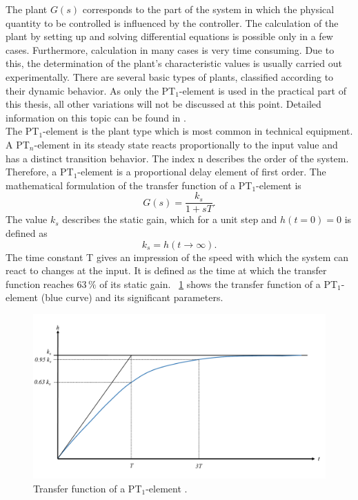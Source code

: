 The plant $G(s)$ corresponds to the part of the system in which the physical quantity to be controlled is influenced by the controller. The calculation of the plant by setting up and solving differential equations is possible only in a few cases. Furthermore, calculation in many cases is very time consuming. Due to this, the determination of the plant's characteristic values is usually carried out experimentally. There are several basic types of plants, classified according to their dynamic behavior. As only the PT$_{1}$-element is used in the practical part of this thesis, all other variations will not be discussed at this point. Detailed information on this topic can be found in \cite{Reg_10}.
\\The PT$_{1}$-element is the plant type which is most common in technical equipment. A PT$_{n}$-element in its steady state reacts proportionally to the input value and has a distinct transition behavior. The index n describes the order of the system. Therefore, a PT$_{1}$-element is a proportional delay element of first order. The mathematical formulation of the transfer function of a PT$_{1}$-element is
\begin{equation}
    G(s) = \frac{k_{s}}{1+sT}.
 \label{eq:tf_pt1}
\end{equation}
The value $k_{s}$ describes the static gain, which for a unit step and $h(t=0)=0$ is defined as
\begin{equation}
  k_s = h(t\rightarrow \infty).
\end{equation}
 The time constant T gives an impression of the speed with which the system can react to changes at the input. It is defined as the time at which the transfer function reaches $63\, \%$ of its static gain. \cite{Reg_10}
\figurename~\ref{fig:tf_pt1} shows the transfer function of a PT$_{1}$-element (blue curve) and its significant parameters.
\begin{figure}[ht]
   \centering
   \includegraphics[width=\textwidth]{images/chapt_3/tf_pt1.pdf}
   \caption[Transfer function of a PT$_{1}$-element]{Transfer function of a PT$_{1}$-element \cite{Reg_10}.}
   \label{fig:tf_pt1}
 \end{figure}

